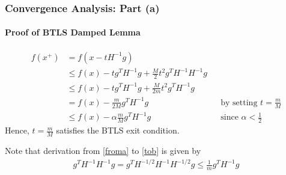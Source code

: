 \documentclass{beamer}
\begin{document}
\begin{frame}
    \frametitle{Convergence Analysis: Part (a)}    
    \framesubtitle{Proof of BTLS Damped Lemma}
    \begin{align}
        f(x^{+}) & = f(x-tH^{-1}g) \nonumber \\
        & \le f(x) - tg^TH^{-1}g + \frac{M}{2}t^2g^TH^{-1}H^{-1}g \label{froma} \\
        & \le f(x) - tg^TH^{-1}g + \frac{M}{2m}t^2 g^T H^{-1}g \label{tob}\\
        & = f(x) -  \frac{m}{2M} g^T H^{-1}g  &&
        \text{by setting $t=\frac{m}{M}$} \nonumber \\
        & \le f(x) - \alpha \frac{m}{M} g^T H^{-1}g && \text{since }\alpha <
        \frac{1}{2} \nonumber
    \end{align}
Hence, $t = \frac{m}{M}$ satisfies the BTLS exit condition.

Note that derivation from \eqref{froma} to \eqref{tob} is given by
\begin{align}
g^TH^{-1}H^{-1}g = g^TH^{-1/2}H^{-1}H^{-1/2}g \le \frac{1}{m} g^T H^{-1}g \nonumber
\end{align}
\end{frame}
\end{document}

